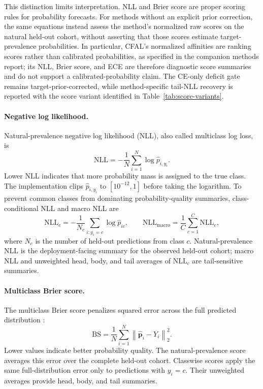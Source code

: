\documentclass[11pt]{article}
\begin{document}
\noindent This distinction limits interpretation. NLL and Brier score are proper scoring rules for probability forecasts. For methods without an explicit prior correction, the same equations instead assess the method's normalized raw scores on the natural held-out cohort, without asserting that those scores estimate target-prevalence probabilities. In particular, CFAL's normalized affinities are ranking scores rather than calibrated probabilities, as specified in the companion methods report; its NLL, Brier score, and ECE are therefore diagnostic score summaries and do not support a calibrated-probability claim. The CE-only deficit gate remains target-prior-corrected, while method-specific tail-NLL recovery is reported with the score variant identified in Table~\ref{tab:score-variants}.

\paragraph{Negative log likelihood.}
Natural-prevalence negative log likelihood (NLL), also called multiclass log loss, is
\begin{equation}
  \mathrm{NLL}=-\frac{1}{N}\sum_{i=1}^{N}\log \hat{p}_{i,y_i}.
  \label{eq:nll}
\end{equation}
\noindent Lower NLL indicates that more probability mass is assigned to the true class. The implementation clips $\hat{p}_{i,y_i}$ to $[10^{-12},1]$ before taking the logarithm. To prevent common classes from dominating probability-quality summaries, class-conditional NLL and macro NLL are
\begin{equation}
  \mathrm{NLL}_c=-\frac{1}{N_c}\sum_{i:y_i=c}\log \hat{p}_{ic},
  \qquad
  \mathrm{NLL}_{\mathrm{macro}}=\frac{1}{C}\sum_{c=1}^{C}\mathrm{NLL}_c,
  \label{eq:macro-nll}
\end{equation}
\noindent where $N_c$ is the number of held-out predictions from class $c$. Natural-prevalence NLL is the deployment-facing summary for the observed held-out cohort; macro NLL and unweighted head, body, and tail averages of $\mathrm{NLL}_c$ are tail-sensitive summaries.

\paragraph{Multiclass Brier score.}
The multiclass Brier score penalizes squared error across the full predicted distribution \citep{brier1950verification}:
\begin{equation}
  \mathrm{BS}=\frac{1}{N}\sum_{i=1}^{N}
  \left\|\hat{\mathbf{p}}_i-Y_i\right\|_2^2.
  \label{eq:brier}
\end{equation}
\noindent Lower values indicate better probability quality. The natural-prevalence score averages this error over the complete held-out cohort. Classwise scores apply the same full-distribution error only to predictions with $y_i=c$. Their unweighted averages provide head, body, and tail summaries.
\end{document}
